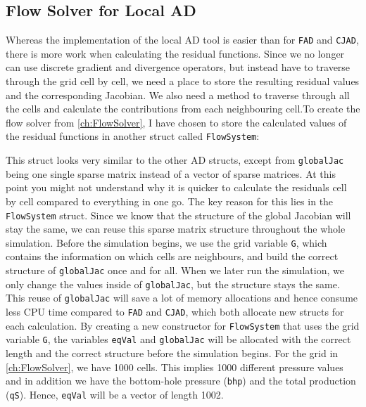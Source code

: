\subsection{Flow Solver for Local AD}
\label{sec:FlowSolverLADImplementation}
Whereas the implementation of the local AD tool is easier than for \texttt{FAD} and \texttt{CJAD}, there is more work when calculating the residual functions. Since we no longer can use discrete gradient and divergence operators, but instead have to traverse through the grid cell by cell, we need a place to store the resulting residual values and the corresponding Jacobian. We also need a method to traverse through all the cells and calculate the contributions from each neighbouring cell.To create the flow solver from \autoref{ch:FlowSolver}, I have chosen to store the calculated values of the residual functions in another struct called \texttt{FlowSystem}:

This struct looks very similar to the other AD structs, except from \texttt{globalJac} being one single sparse matrix instead of a vector of sparse matrices. At this point you might not understand why it is quicker to calculate the residuals cell by cell compared to everything in one go. The key reason for this lies in the \texttt{FlowSystem} struct. Since we know that the structure of the global Jacobian will stay the same, we can reuse this sparse matrix structure throughout the whole simulation. Before the simulation begins, we use the grid variable \texttt{G}, which contains the information on which cells are neighbours, and build the correct structure of \texttt{globalJac} once and for all. When we later run the simulation, we only change the values inside of \texttt{globalJac}, but the structure stays the same. This reuse of \texttt{globalJac} will save a lot of memory allocations and hence consume less CPU time compared to \texttt{FAD} and \texttt{CJAD}, which both allocate new structs for each calculation. By creating a new constructor for \texttt{FlowSystem} that uses the grid variable \texttt{G}, the variables \texttt{eqVal} and \texttt{globalJac} will be allocated with the correct length and the correct structure before the simulation begins. For the grid in \autoref{ch:FlowSolver}, we have 1000 cells. This implies 1000 different pressure values and in addition we have the bottom-hole pressure (\texttt{bhp}) and the total production (\texttt{qS}). Hence, \texttt{eqVal} will be a vector of length 1002.

